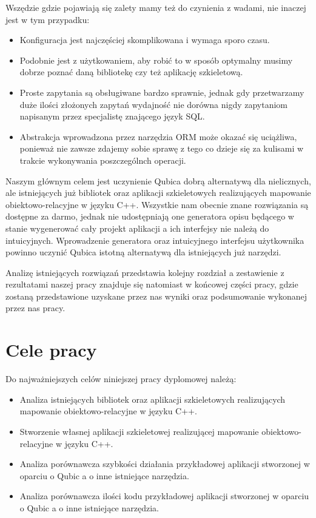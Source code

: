 \documentclass[12pt]{report}
\begin{document}
Wszędzie gdzie pojawiają się zalety mamy też do czynienia z wadami, nie inaczej jest w tym przypadku:

\begin{itemize}
\item Konfiguracja jest najczęściej skomplikowana i wymaga sporo czasu.
\item Podobnie jest z użytkowaniem, aby robić to w sposób optymalny musimy dobrze poznać daną bibliotekę czy też aplikację szkieletową.
\item Proste zapytania są obsługiwane bardzo sprawnie, jednak gdy przetwarzamy duże ilości złożonych zapytań wydajność nie dorówna nigdy zapytaniom na\-pi\-sa\-nym
przez specjalistę znającego język SQL.
\item Abstrakcja wprowadzona przez narzędzia ORM może okazać się uciążliwa, ponieważ nie zawsze zdajemy sobie sprawę z tego co dzieje się za kulisami w trakcie
wykonywania poszczególnch operacji.
\end{itemize}

Naszym głównym celem jest uczynienie Qubica dobrą alternatywą dla nie\-li\-cznych, ale istniejących już bibliotek oraz aplikacji szkieletowych realizujących mapowanie 
obiektowo-relacyjne w języku C++. Wszystkie nam obecnie znane rozwiązania są dostępne za darmo, jednak nie udostępniają one generatora opisu będącego w stanie 
wygenerować cały projekt aplikacji a ich interfejsy nie należą do intuicyjnych. Wprowadzenie generatora oraz intuicyjnego interfejsu użytkownika powinno uczynić Qubica
istotną alternatywą dla istniejących już narzędzi.

Analizę istniejących rozwiązań przedstawia kolejny rozdział a zestawienie z rezultatami naszej pracy znajduje się natomiast w końcowej części pracy, gdzie zostaną
przedstawione uzyskane przez nas wyniki oraz podsumowanie wykonanej przez nas pracy.

\section{Cele pracy} %

Do najważniejszych celów niniejszej pracy dyplomowej należą:

\begin{itemize}
\item Analiza istniejących bibliotek oraz aplikacji szkieletowych realizujących ma\-po\-wa\-nie obiektowo-relacyjne w języku C++.
\item Stworzenie własnej aplikacji szkieletowej realizującej mapowanie obiektowo-relacyjne w języku C++.
\item Analiza porównawcza szybkości działania przykładowej aplikacji stworzonej w oparciu o Qubic a o inne istniejące narzędzia.
\item Analiza porównawcza ilości kodu przykładowej aplikacji stworzonej w oparciu o Qubic a o inne istniejące narzędzia.
\end{itemize}
\end{document}
